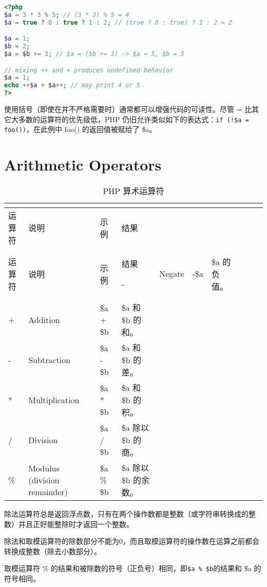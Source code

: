 \begin{lstlisting}[language=PHP]
<?php
$a = 3 * 3 % 5; // (3 * 3) % 5 = 4
$a = true ? 0 : true ? 1 : 2; // (true ? 0 : true) ? 1 : 2 = 2

$a = 1;
$b = 2;
$a = $b += 3; // $a = ($b += 3) -> $a = 5, $b = 5

// mixing ++ and + produces undefined behavior
$a = 1;
echo ++$a + $a++; // may print 4 or 5
?>
\end{lstlisting}

使用括号（即使在并不严格需要时）通常都可以增强代码的可读性。尽管 = 比其它大多数的运算符的优先级低，PHP 仍旧允许类似如下的表达式：\texttt{if (!\$a = foo())}，在此例中 foo() 的返回值被赋给了 \$a。

\section{Arithmetic Operators}

\begin{longtable}{|m{35pt}|m{130pt}|m{50pt}|m{150pt}|}
\tabularnewline\hline
运算符	&说明	&示例	&结果
\endhead

\caption{PHP 算术运算符}\\
\hline
运算符	&说明	&示例	&结果
\endfirsthead

\endfoot

\endlastfoot
\hline
- &Negate		&-\$a					&\$a 的负值。\\
\hline
+	&Addition		&\$a + \$b		&\$a 和 \$b 的和。\\
\hline
-	&Subtraction	&\$a - \$b		&\$a 和 \$b 的差。\\
\hline
*	&Multiplication	&\$a * \$b		&\$a 和 \$b 的积。\\
\hline
/	&Division		&\$a / \$b		&\$a 除以\$b 的商。\\
\hline
\%	&Modulus (division remainder)	&\$a \% \$b &\$a 除以 \$b 的余数。\\
\hline
\end{longtable}

\begin{compactitem}
\item 除法运算符总是返回浮点数，只有在两个操作数都是整数（或字符串转换成的整数）并且正好能整除时才返回一个整数。
\item 除法和取模运算符的除数部分不能为0，而且取模运算符的操作数在运算之前都会转换成整数（除去小数部分）。
\item 取模运算符 \% 的结果和被除数的符号（正负号）相同，即\texttt{\$a \% \$b}的结果和 \$a 的符号相同。
\end{compactitem}


